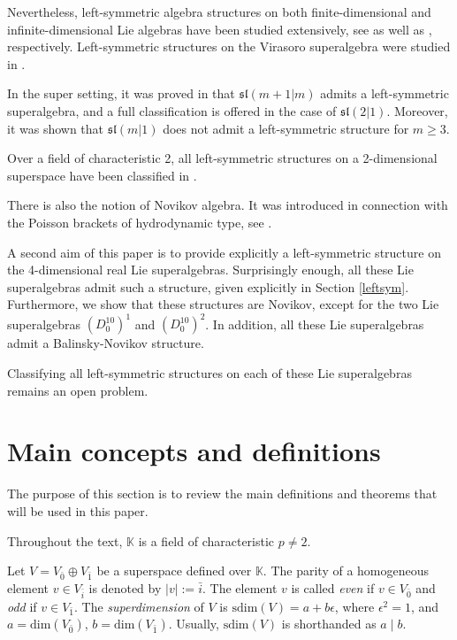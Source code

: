 \documentclass[12pt]{amsart}
\begin{document}
Nevertheless, left-symmetric algebra structures on both finite-dimensional and infinite-dimensional Lie algebras have been studied extensively, see \cite{Bai, B2, YZ} as well as \cite{CL, KCB, TB}, respectively. Left-symmetric structures on the Virasoro superalgebra were studied in \cite{KB}.
 

In the super setting, it was proved in \cite{DZ} that  $\mathfrak{sl}(m +1|m)$ admits a left-symmetric superalgebra, and a full classification is offered in the case of  $\mathfrak{sl}(2|1)$. Moreover, it was shown that $\mathfrak{sl}(m|1)$ does not admit a left-symmetric structure for $m \geq 3$. 

Over a field of characteristic 2, all left-symmetric structures on a 2-dimensional superspace have been classified in \cite{BBE}.

There is also the notion of Novikov algebra. It was introduced in connection with the Poisson brackets of hydrodynamic type, see \cite{BN}.

A second aim of this paper is to provide explicitly a left-symmetric structure on the 4-dimensional real Lie superalgebras. Surprisingly  enough, all these Lie superalgebras admit such a structure, given explicitly in Section \ref{leftsym}. Furthermore, we show that these structures are Novikov, except for the two Lie superalgebras $(D_0^{10})^1$ and $(D_0^{10})^2$. In addition, all these Lie superalgebras admit a Balinsky-Novikov structure.

Classifying all left-symmetric structures on each of these Lie superalgebras remains an open problem. 





\section{Main concepts and definitions}

The purpose of this section is to review the main definitions and theorems that will be used in this paper. 

Throughout the text,  $\mathbb K$ is a field of characteristic $p\not =2$. 

Let $V=V_{\bar 0}\oplus V_{\bar 1}$ be a superspace defined over  ${\mathbb K}$. The parity of a homogeneous element $v\in V_{\bar{i}}$ is denoted by $|v|:=\bar{i}$. The element $v$ is called \textit{even} if $v\in V_{\bar 0}$ and \textit{odd} if $v\in V_{\bar 1}$. The {\it superdimension} of $V$ is $\mathrm{sdim}(V)=a+b\epsilon$, where $\epsilon^2=1$, and $a=\mathrm{dim}(V_{\bar 0})$, $b=\mathrm{dim}(V_{\bar 1})$. Usually, $\mathrm{sdim}(V)$ is shorthanded as $a\mid b$. 
\end{document}
